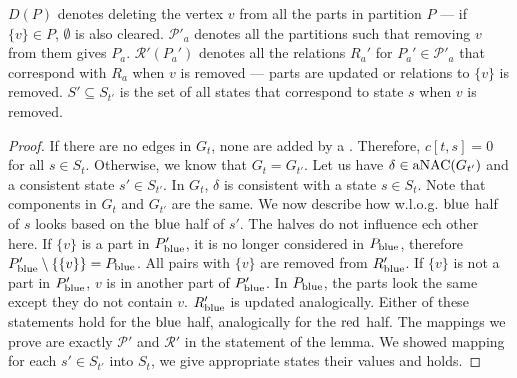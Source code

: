 \( D(P) \) denotes deleting the vertex \( v \) from all the parts in partition \( P \)
--- if \( \{v\} \in P \), \( \emptyset \) is also cleared.
\( \mathcal{P'}_a \) denotes all the partitions such that removing \( v \) from them gives \( P_a \).
\( \mathcal{R'}(P_a') \) denotes all the relations \( R_a' \)
for \( P_a' \in \mathcal{P'}_a \) that correspond with \( R_a \) when \( v \) is removed
--- parts are updated or relations to \( \{v\} \) is removed.
\( S' \subseteq S_{t'} \) is the set of all states that
correspond to state \( s \) when \( v \) is removed.
%
\begin{proof}
	If there are no edges in \( G_t \), none are added by a \ForgetVertexNode{}.
	Therefore, \( c[t, s] = 0 \) for all \( s \in S_t \).
	Otherwise, we know that \( G_t = G_{t'} \).
	Let us have \( \delta \in \operatorname{aNAC}(G_{t'}) \)
	and a consistent state \( s' \in S_{t'} \).
	In \( G_t \), \( \delta \) is consistent with a state \( s \in S_t \).
	Note that components in \( G_t \) and \( G_{t'} \) are the same.
	We now describe how w.l.o.g. \( \text{blue} \) half of \( s \) looks
	based on the \( \text{blue} \) half of \( s' \).
	The halves do not influence ech other here.
	If \( \{v\} \) is a part in \( P_{\text{blue}}' \),
	it is no longer considered in \( P_{\text{blue}} \),
	therefore \( P_{\text{blue}}' \setminus \{\{v\}\} = P_{\text{blue}} \).
	All pairs with \( \{v\} \) are removed from \( R_{\text{blue}}' \).
	If \( \{v\} \) is not a part in \( P_{\text{blue}}' \),
	\( v \) is in another part of \( P_{\text{blue}}' \).
	In \( P_{\text{blue}} \), the parts look the same except they do not
	contain \( v \). \( R_{\text{blue}}' \) is updated analogically.
	Either of these statements hold for the \( \text{blue} \) half,
	analogically for the \( \text{red} \) half.
	The mappings we prove are exactly \( \mathcal{P'} \) and \( \mathcal{R'} \)
	in the statement of the lemma.
	We showed mapping for each \( s' \in S_{t'} \) into \( S_t \),
	we give appropriate states their values and  holds.
\end{proof}
%

\subsubsection*{\IntroduceEdgeNode{}}

